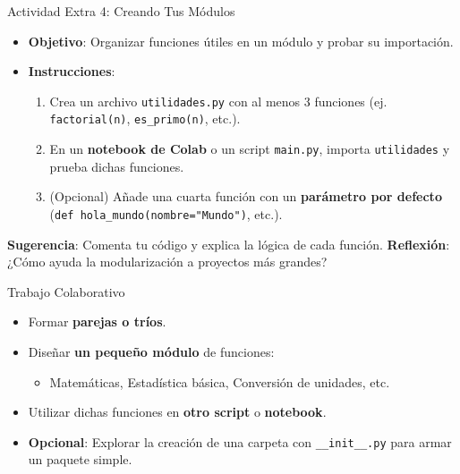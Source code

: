 \documentclass[10pt]{beamer}
\begin{document}
\begin{frame}{Actividad Extra 4: Creando Tus Módulos}
  \begin{itemize}
    \item \textbf{Objetivo}: Organizar funciones útiles en un módulo y probar su importación.
    \item \textbf{Instrucciones}:
      \begin{enumerate}
        \item Crea un archivo \texttt{utilidades.py} con al menos 3 funciones (ej. \texttt{factorial(n)}, \texttt{es\_primo(n)}, etc.).
        \item En un \textbf{notebook de Colab} o un script \texttt{main.py}, importa \texttt{utilidades} y prueba dichas funciones.
        \item (Opcional) Añade una cuarta función con un \textbf{parámetro por defecto} (\texttt{def hola\_mundo(nombre="Mundo")}, etc.).
      \end{enumerate}
  \end{itemize}
  \textbf{Sugerencia}: Comenta tu código y explica la lógica de cada función.
  \textbf{Reflexión}: ¿Cómo ayuda la modularización a proyectos más grandes?
\end{frame}

\begin{frame}{Trabajo Colaborativo}
  \begin{itemize}
    \item Formar \textbf{parejas o tríos}.
    \item Diseñar \textbf{un pequeño módulo} de funciones:
      \begin{itemize}
        \item Matemáticas, Estadística básica, Conversión de unidades, etc.
      \end{itemize}
    \item Utilizar dichas funciones en \textbf{otro script} o \textbf{notebook}.
    \item \textbf{Opcional}: Explorar la creación de una carpeta con \texttt{\_\_init\_\_.py} para armar un paquete simple.
  \end{itemize}
\end{frame}
\end{document}
